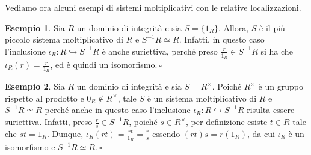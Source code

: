 \documentclass{article}
\theoremstyle{definition}
\newtheorem*{exm}{Esempio}
\begin{document}
\noindent Vediamo ora alcuni esempi di sistemi moltiplicativi con le relative localizzazioni.

\begin{exm}Sia $R$ un dominio di integrità e sia $S=\{1_R\}$. Allora, $S$ è il più piccolo sistema moltiplicativo di $R$ e $S^{-1}R\simeq R$. Infatti, in questo caso l'inclusione $\iota_R\colon R\hookrightarrow S^{-1}R$ è anche suriettiva, perché preso $\frac{r}{1_R}\in S^{-1}R$ si ha che $\iota_R(r)=\frac{r}{1_R}$, ed è quindi un isomorfismo$. \ \square$\end{exm}

\begin{exm}Sia $R$ un dominio di integrità e sia $S=R^{\times}$. Poiché $R^{\times}$ è un gruppo rispetto al prodotto e $0_R\not\in R^{\times}$, tale $S$ è un sistema moltiplicativo di $R$ e $S^{-1}R\simeq R$ perché anche in questo caso l'inclusione $\iota_R\colon R\hookrightarrow S^{-1}R$ risulta essere suriettiva. Infatti, preso $\frac{r}{s}\in S^{-1}R$, poiché $s\in R^{\times}$, per definizione esiste $t\in R$ tale che $st=1_R$. Dunque, $\iota_R(rt)=\frac{rt}{1_R}=\frac{r}{s}$ essendo $(rt)s=r(1_R)$, da cui $\iota_R$ è un isomorfismo e $S^{-1}R\simeq R. \ \square$\end{exm}
\end{document}
